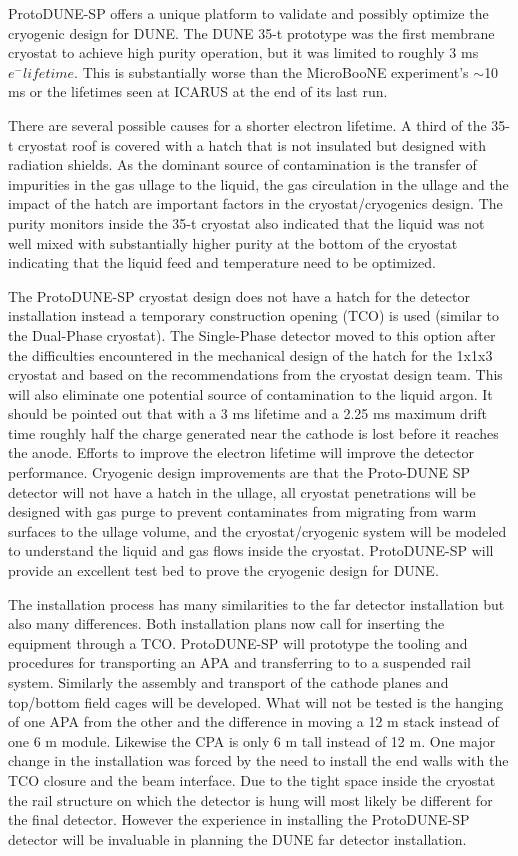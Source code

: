 ProtoDUNE-SP offers a unique platform to validate and possibly optimize the cryogenic design for DUNE. The DUNE 35-t prototype was the first membrane cryostat to achieve high purity operation, but it was limited to roughly 3 ms $e^-lifetime$. This is substantially worse than the MicroBooNE experiment's  $\sim$10 ms or the lifetimes seen at ICARUS at the end of its last run. 

There are several possible causes for a shorter electron lifetime.  A third of the 35-t cryostat roof is covered with a hatch that is not insulated but designed with radiation shields. As the dominant source of contamination is the transfer of impurities in the gas ullage to the liquid, the gas circulation in the ullage and the impact of the hatch are important factors in the cryostat/cryogenics design. The purity monitors inside the 35-t cryostat also indicated that the liquid was not well mixed with substantially higher purity at the bottom of the cryostat indicating that the liquid feed and temperature need to be optimized.  

The ProtoDUNE-SP cryostat design does not have a hatch for the detector installation instead a temporary construction opening (TCO) is used (similar to the Dual-Phase cryostat). The Single-Phase detector moved to this option after the difficulties encountered in the mechanical design of the hatch for the 1x1x3 cryostat and based on the recommendations from the cryostat design team.  This will also eliminate one potential source of contamination to the liquid argon. It should be pointed out that with a 3 ms lifetime and a 2.25 ms maximum drift time roughly half the charge generated near the cathode is lost before it reaches the anode. Efforts to improve the electron lifetime will improve the detector performance.  Cryogenic design improvements are that the Proto-DUNE SP detector will not have a hatch in the ullage, all cryostat penetrations will be designed with gas purge to prevent contaminates from migrating from warm surfaces to the ullage volume, and the cryostat/cryogenic system will be modeled to understand the liquid and gas flows inside the cryostat. ProtoDUNE-SP will provide an excellent test bed to prove the cryogenic design for DUNE. 

The installation process has many similarities to the far detector installation but also many differences. Both installation plans now call for inserting the equipment through a TCO. ProtoDUNE-SP will prototype the tooling and procedures for transporting an APA and transferring to to a suspended rail system. Similarly the assembly and transport of the cathode planes and top/bottom field cages will be developed. What will not be tested is the hanging of one APA from the other and the difference in moving a 12 m stack instead of one 6 m module. Likewise the CPA is only 6 m tall instead of 12 m. One major change in the installation was forced by the need to install the end walls with the TCO closure and the beam interface. Due to the tight space inside the cryostat the rail structure on which the detector is hung will most likely be different for the final detector. However the experience in installing the ProtoDUNE-SP detector will be invaluable in planning the DUNE far detector installation. 

